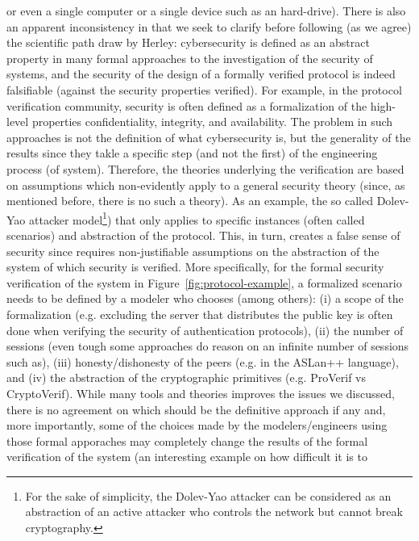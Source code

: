 or even a single computer or a single device such as an hard-drive).  There is
also an apparent inconsistency in\autocite{Herley2016unfalsifiability} that we
seek to clarify before following (as we agree) the scientific path draw by
Herley: cybersecurity is defined as an abstract property in many formal
approaches to the investigation of the security of systems, and the security of the design of a
formally verified protocol is indeed falsifiable (against the security properties verified).  For example, in the protocol
verification community, security is often defined as a formalization of the
high-level properties confidentiality, integrity, and availability. The problem
in such approaches is not the definition of what cybersecurity is, but 
the generality of the results since they takle a specific step (and not the first) of the engineering process (of system).
Therefore, the theories underlying the verification are based on 
assumptions which non-evidently apply to a general security theory (since, as mentioned before,
there is no such a theory).
As an example, the so called Dolev-Yao attacker model\footnote{For the sake of
simplicity, the Dolev-Yao attacker can be considered as an abstraction of an
active attacker who controls the network but cannot break
cryptography.}\autocite{Dolev1983security})
that only applies to specific instances (often called scenarios) and
abstraction of the protocol. This, in turn, creates a false sense of security
since requires non-justifiable assumptions on the abstraction of the system of which security
is verified. More specifically, for the formal security verification of the system
in Figure~\ref{fig:protocol-example}, a formalized scenario needs to be defined
by a modeler who chooses (among others): (i) a scope of the formalization (e.g.
excluding the server that distributes the public key is often done when
verifying the security of authentication protocols), (ii) the number of
sessions (even tough some approaches do reason on an infinite number of
sessions such as\autocite{Escobar2007maudenpa}), (iii) honesty/dishonesty of
the peers (e.g.  in the ASLan++ language\autocite{Oheimb2010aslan++}), and (iv)
the abstraction of the cryptographic primitives (e.g.  ProVerif vs
CryptoVerif\autocite{Blanchet2017symbolic}).  While many tools and theories
improves the issues we discussed, there is no agreement on which should be
the definitive approach if any and, more importantly, some of the choices made by the modelers/engineers using those formal apporaches may
completely change the results of the formal verification of the system (an interesting example on how difficult it is to 
